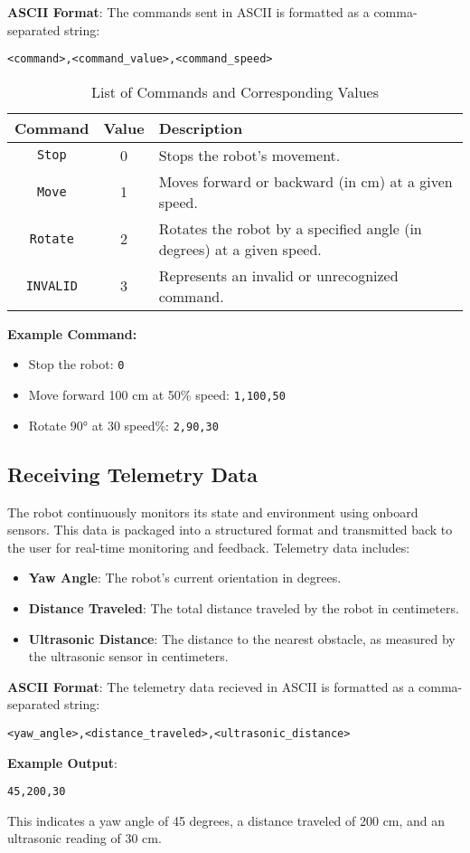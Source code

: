 \textbf{ASCII Format}:
The commands sent in ASCII is formatted as a comma-separated string:
\begin{lstlisting}[]
	<command>,<command_value>,<command_speed>
\end{lstlisting}

\begin{table}[H]
	\centering
	\caption{List of Commands and Corresponding Values}
	\label{tab:commands}
	\begin{tabular}{|c|c|l|}
		\hline
		\textbf{Command} & \textbf{Value} & \textbf{Description} \\ \hline
		\texttt{Stop}     & 0              & Stops the robot's movement. \\ \hline
		\texttt{Move}     & 1              & Moves forward or backward (in cm) at a given speed. \\ \hline
		\texttt{Rotate}   & 2              & Rotates the robot by a specified angle (in degrees) at a given speed. \\ \hline
		\texttt{INVALID}  & 3              & Represents an invalid or unrecognized command. \\ \hline
	\end{tabular}
\end{table}

\textbf{Example Command:}
\begin{itemize}
	\item Stop the robot: \texttt{0}
	\item Move forward 100 cm at 50\% speed:  \texttt{1,100,50}
	\item Rotate 90° at 30 speed\%: \texttt{2,90,30}
\end{itemize}

\subsection{Receiving Telemetry Data}
The robot continuously monitors its state and environment using onboard sensors. This data is packaged into a structured format and transmitted back to the user for real-time monitoring and feedback. Telemetry data includes:
\begin{itemize}
	\item \textbf{Yaw Angle}: The robot's current orientation in degrees.
 	\item \textbf{Distance Traveled}: The total distance traveled by the robot in centimeters.
	\item \textbf{Ultrasonic Distance}: The distance to the nearest obstacle, as measured by the ultrasonic sensor in centimeters.
\end{itemize}

\textbf{ASCII Format}:
The telemetry data recieved in ASCII is formatted as a comma-separated string:
\begin{lstlisting}[]
	<yaw_angle>,<distance_traveled>,<ultrasonic_distance>
\end{lstlisting}
\textbf{Example Output}:
\begin{lstlisting}[]
	45,200,30
\end{lstlisting}

This indicates a yaw angle of 45 degrees, a distance traveled of 200 cm, and an ultrasonic reading of 30 cm.
